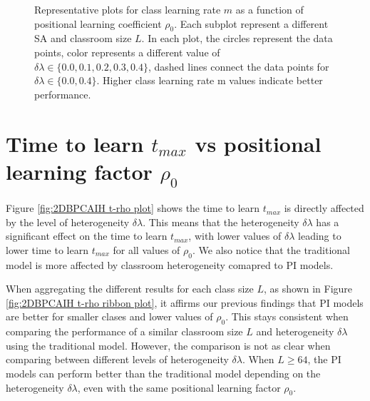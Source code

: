 \begin{figure}[htbp!]
   \caption{Representative plots for class learning rate $m$ as a function of positional learning coefficient $\rho_0$.
   Each subplot represent a different SA and classroom size $L$.
   In each plot, the circles represent the data points, color represents a different value of $\delta\lambda \in \lbrace 0.0, 0.1, 0.2, 0.3, 0.4 \rbrace$, dashed lines connect the data points for $\delta\lambda \in \lbrace 0.0, 0.4 \rbrace$.
   Higher class learning rate m values indicate better performance.
   }
   \label{fig:2DBPCAIH m rho plot}
\end{figure}

\newpage %

\section{Time to learn $t_{max}$ vs positional learning factor $\rho_0$}\label{sec:BPCAIH t vs rho}
Figure \ref{fig:2DBPCAIH t-rho plot} shows the time to learn $t_{max}$ is directly affected by the level of heterogeneity $\delta\lambda$. 
This means that the heterogeneity $\delta\lambda$ has a significant effect on the time to learn $t_{max}$, with lower values of $\delta\lambda$ leading to lower time to learn $t_{max}$ for all values of $\rho_0$. 
We also notice that the traditional model is more affected by classroom heterogeneity comapred to PI models.

When aggregating the different results for each class size $L$, as shown in Figure \ref{fig:2DBPCAIH t-rho ribbon plot}, it affirms our previous findings that PI models are better for smaller clases and lower values of $\rho_0$.
This stays consistent when comparing the performance of a similar classroom size $L$ and heterogeneity $\delta\lambda$ using the traditional model.
However, the comparison is not as clear when comparing between different levels of heterogeneity $\delta\lambda$.
When $L\geq64$, the PI models can perform better than the traditional model depending on the heterogeneity $\delta\lambda$, even with the same positional learning factor $\rho_0$.

